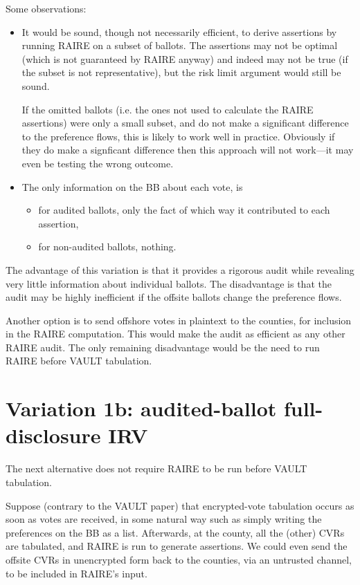 \documentclass[10pt,a4paper]{article}
\begin{document}
	Some observations:
	\begin{itemize}
		\item It would be sound, though not necessarily efficient, to derive assertions by running RAIRE on a subset of ballots. The assertions may not be optimal (which is not guaranteed by RAIRE anyway) and indeed may not be true (if the subset is not representative), but the risk limit argument would still be sound.
		
		If the omitted ballots (i.e. the ones not used to calculate the RAIRE assertions) were only a small subset, and do not make a significant difference to the preference flows, this is likely to work well in practice. Obviously if they do make a signficant difference then this approach will not work---it may even be testing the wrong outcome.
		
		\item The only information on the BB about each vote, is
		\begin{itemize}
			\item for audited ballots, only the fact of which way it contributed to each assertion,
			\item for non-audited ballots, nothing.
		\end{itemize}
	\end{itemize}

    The advantage of this variation is that it provides a rigorous audit while revealing very little information about individual ballots. The disadvantage is that the audit may be highly inefficient if the offsite ballots change the preference flows.
    
    Another option is to send offshore votes in plaintext to the counties, for inclusion in the RAIRE computation. This would make the audit as efficient as any other RAIRE audit. The only remaining disadvantage would be the need to run RAIRE before VAULT tabulation.

	\section{Variation 1b: audited-ballot full-disclosure IRV}	
	The next alternative does not require RAIRE to be run before VAULT tabulation.
	
	Suppose (contrary to the VAULT paper) that encrypted-vote tabulation occurs as soon as votes are received, in some natural way such as simply writing the preferences on the BB as a list. Afterwards, at the county, all the (other) CVRs are tabulated, and RAIRE is run to generate assertions. We could even send the offsite CVRs in unencrypted form back to the counties, via an untrusted channel, to be included in RAIRE's input.
	
\end{document}
